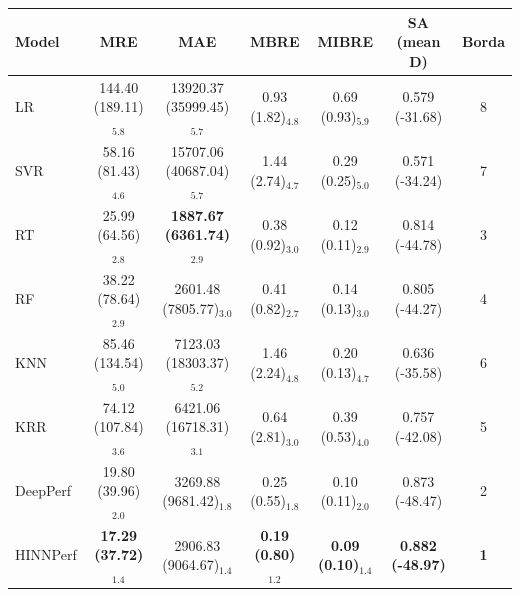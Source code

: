 \begin{tabular}{lcccccc}
\toprule
Model & MRE & MAE & MBRE & MIBRE & SA (mean D) & Borda \\
\midrule
LR & 144.40 (189.11)$_{5.8}$ & 13920.37 (35999.45)$_{5.7}$ & 0.93 (1.82)$_{4.8}$ & 0.69 (0.93)$_{5.9}$ & 0.579 (-31.68) & 8 \\
SVR & 58.16 (81.43)$_{4.6}$ & 15707.06 (40687.04)$_{5.7}$ & 1.44 (2.74)$_{4.7}$ & 0.29 (0.25)$_{5.0}$ & 0.571 (-34.24) & 7 \\
RT & 25.99 (64.56)$_{2.8}$ & \textbf{1887.67 (6361.74)$_{2.9}$} & 0.38 (0.92)$_{3.0}$ & 0.12 (0.11)$_{2.9}$ & 0.814 (-44.78) & 3 \\
RF & 38.22 (78.64)$_{2.9}$ & 2601.48 (7805.77)$_{3.0}$ & 0.41 (0.82)$_{2.7}$ & 0.14 (0.13)$_{3.0}$ & 0.805 (-44.27) & 4 \\
KNN & 85.46 (134.54)$_{5.0}$ & 7123.03 (18303.37)$_{5.2}$ & 1.46 (2.24)$_{4.8}$ & 0.20 (0.13)$_{4.7}$ & 0.636 (-35.58) & 6 \\
KRR & 74.12 (107.84)$_{3.6}$ & 6421.06 (16718.31)$_{3.1}$ & 0.64 (2.81)$_{3.0}$ & 0.39 (0.53)$_{4.0}$ & 0.757 (-42.08) & 5 \\
DeepPerf & 19.80 (39.96)$_{2.0}$ & 3269.88 (9681.42)$_{1.8}$ & 0.25 (0.55)$_{1.8}$ & 0.10 (0.11)$_{2.0}$ & 0.873 (-48.47) & 2 \\
HINNPerf & \textbf{17.29 (37.72)$_{1.4}$} & 2906.83 (9064.67)$_{1.4}$ & \textbf{0.19 (0.80)$_{1.2}$} & \textbf{0.09 (0.10)$_{1.4}$} & \textbf{0.882 (-48.97)} & \textbf{1} \\
\bottomrule
\end{tabular}
